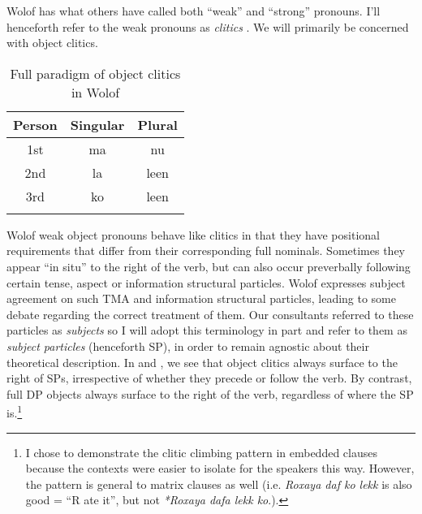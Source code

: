 \documentclass[output=paper]{langscibook}
\begin{document}
Wolof has what others have called both ``weak'' and ``strong'' pronouns. I'll henceforth refer to the weak pronouns as \emph{clitics} \citep{dunigan:1994,torrence:2005,russel:2006,martinovic:2015}. We will primarily be concerned with object clitics.


\begin{table}[H]
\begin{center}
\begin{tabular}{ c  c  c }
\lsptoprule
Person & Singular & Plural\\
\midrule
1st & ma & nu \\ 
2nd & la & leen \\ 
3rd & ko & leen \\ 
\lspbottomrule
\end{tabular}
\caption{Full paradigm of object clitics in Wolof}
\end{center}
\end{table}

Wolof weak object pronouns behave like clitics in that they have positional requirements that differ from their corresponding full nominals. Sometimes they appear ``in situ'' to the right of the verb, but can also occur preverbally following certain tense, aspect or information structural particles. Wolof expresses subject agreement on such TMA and information structural particles, leading to some debate regarding the correct treatment of them. Our consultants referred to these particles as \emph{subjects} so I will adopt this terminology in part and refer to them as \emph{subject particles} (henceforth SP), in order to remain agnostic about their theoretical description. In  and , we see that object clitics always surface to the right of SPs, irrespective of whether they precede or follow the verb. By contrast, full DP objects always surface to the right of the verb, regardless of where the SP is.\footnote{I chose to demonstrate the clitic climbing pattern in embedded clauses because the contexts were easier to isolate for the speakers this way. However, the pattern is general to matrix clauses as well (i.e. \emph{Roxaya daf ko lekk} is also good = ``R ate it'', but not \emph{*Roxaya dafa lekk ko}.).}
\end{document}
